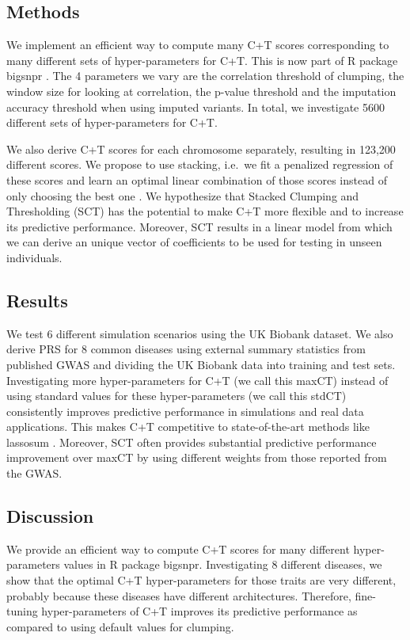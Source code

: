 \subsection{Methods}

We implement an efficient way to compute many C+T scores corresponding to many different sets of hyper-parameters for C+T. This is now part of R package bigsnpr \cite[]{prive2018efficient}. 
The 4 parameters we vary are the correlation threshold of clumping, the window size for looking at correlation, the p-value threshold and the imputation accuracy threshold when using imputed variants.
In total, we investigate 5600 different sets of hyper-parameters for C+T.

We also derive C+T scores for each chromosome separately, resulting in 123,200 different scores.
We propose to use stacking, i.e.\ we fit a penalized regression of these scores and learn an optimal linear combination of those scores instead of only choosing the best one \cite[]{breiman1996stacked}.
We hypothesize that Stacked Clumping and Thresholding (SCT) has the potential to make C+T more flexible and to increase its predictive performance.
Moreover, SCT results in a linear model from which we can derive an unique vector of coefficients to be used for testing in unseen individuals.

\subsection{Results}

We test 6 different simulation scenarios using the UK Biobank dataset. We also derive PRS for 8 common diseases using external summary statistics from published GWAS and dividing the UK Biobank data into training and test sets.
Investigating more hyper-parameters for C+T (we call this maxCT) instead of using standard values for these hyper-parameters (we call this stdCT) consistently improves predictive performance in simulations and real data applications.
This makes C+T competitive to state-of-the-art methods like lassosum \cite[]{mak2017polygenic}.
Moreover, SCT often provides substantial predictive performance improvement over maxCT by using different weights from those reported from the GWAS.

\subsection{Discussion}

We provide an efficient way to compute C+T scores for many different hyper-parameters values in R package bigsnpr.
Investigating 8 different diseases, we show that the optimal C+T hyper-parameters for those traits are very different, probably because these diseases have different architectures.
Therefore, fine-tuning hyper-parameters of C+T improves its predictive performance as compared to using default values for clumping. 

